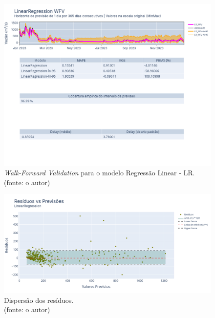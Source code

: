 \begin{figure}[!h]
\centering
\includegraphics[scale=0.33]{Figuras/jequiti/resultados/LR_WFV_SCLD.png}
\caption{\textit{Walk-Forward Validation} para o modelo Regressão Linear - LR.\\(fonte: o autor)}
\label{fig:jequiti_LR_WFV_SCLD}
\end{figure}

\begin{figure}[!h]
\centering
\includegraphics[scale=0.33]{Figuras/jequiti/resultados/LR_WFV_SCLD_RESID_x_PREV.png}
\caption{Dispersão dos resíduos.\\(fonte: o autor)}
\label{fig:jequiti_LR_WFV_SCLD_RESID_x_PREV}
\end{figure}

